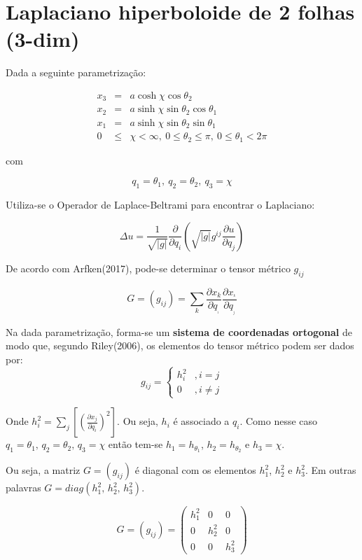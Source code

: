 \documentclass[12pt, a4papper]{article}
\begin{document}
\section{Laplaciano hiperboloide de 2 folhas (3-dim)}

Dada a seguinte parametrização:

\begin{eqnarray*}
x_{3} & = & a\cosh\chi\cos\theta_{2}\\
x_{2} & = & a\sinh\chi\sin\theta_{2}\cos\theta_{1}\\
x_{1} & = & a\sinh\chi\sin\theta_{2}\sin\theta_{1}\\
0 & \leq & \chi<\infty,\ 0\leq\theta_{2}\leq\pi,\ 0\leq\theta_{1}<2\pi
\end{eqnarray*}

com

\[
q_{1}=\theta_{1},\ q_{2}=\theta_{2},\ q_{3}=\chi
\]

Utiliza-se o Operador de Laplace-Beltrami para encontrar o Laplaciano:

\[
\Delta u=\frac{1}{\sqrt{\left\vert g\right\vert }}\frac{\partial}{\partial q_{i}}\left(\sqrt{\left\vert g\right\vert }g^{ij}\frac{\partial u}{\partial q_{j}}\right)
\]

De acordo com Arfken(2017), pode-se determinar o tensor métrico $g_{ij}$

\[
G=(g_{ij})=\underset{k}{\sum}\frac{\partial x_{k}}{\partial q_{_{^{i}}}}\frac{\partial x_{^{_{k}}}}{\partial q_{_{^{j}}}}
\]

Na dada parametrização, forma-se um \textbf{sistema de coordenadas
ortogonal} de modo que, segundo Riley(2006), os elementos do tensor
métrico podem ser dados por:
\[
g_{ij}=\begin{cases}
h_{i}^{2} & ,i=j\\
0 & ,i\neq j
\end{cases}
\]

Onde $h_{i}^{2}=\sum_{j}\left[\left(\frac{\partial x_{j}}{\partial q_{i}}\right)^{2}\right]$.
Ou seja, $h_{i}$ é associado a $q_{i}$. Como nesse caso $q_{1}=\theta_{1},\,q_{2}=\theta_{2},\,q_{3}=\chi$
então tem-se $h_{1}=h_{\theta_{1}}$, $h_{2}=h_{\theta_{2}}$ e $h_{3}=\chi$.

Ou seja, a matriz $G=(g_{ij})$ é diagonal com os elementos $h_{1}^{2}$,
$h_{2}^{2}$ e $h_{3}^{2}$. Em outras palavras $G=diag(h_{1}^{2},\,h_{2}^{2},\,h_{3}^{2})$.

\[
G=(g_{ij})=\left(\begin{array}{ccc}
h_{1}^{2} & 0 & 0\\
0 & h_{2}^{2} & 0\\
0 & 0 & h_{3}^{2}
\end{array}\right)
\]
\end{document}
